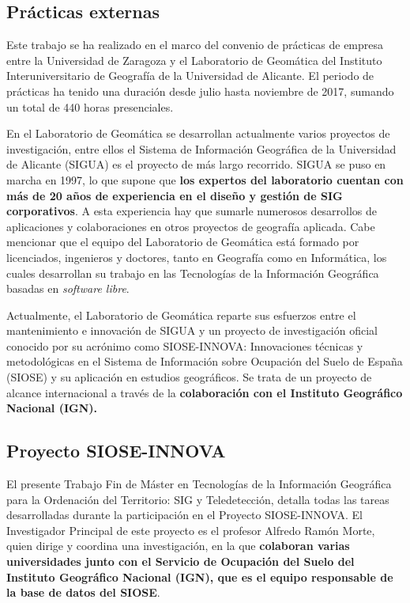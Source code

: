 
\begin{prologo}\label{chap:prol}

\subsection*{Prácticas externas}
Este trabajo se ha realizado en el marco del convenio de prácticas de empresa entre la Universidad de Zaragoza y el Laboratorio de Geomática del Instituto Interuniversitario de Geografía de la Universidad de Alicante. El periodo de prácticas ha tenido una duración desde julio hasta noviembre de 2017, sumando un total de 440 horas presenciales.

En el Laboratorio de Geomática se desarrollan actualmente varios proyectos de investigación, entre ellos el Sistema de Información Geográfica de la Universidad de Alicante (SIGUA) es el proyecto de más largo recorrido. SIGUA se puso en marcha en 1997, lo que supone que \textbf{los expertos del laboratorio cuentan con más de 20 años de experiencia en el diseño y gestión de SIG corporativos}. A esta experiencia hay que sumarle numerosos desarrollos de aplicaciones y colaboraciones en otros proyectos de geografía aplicada. Cabe mencionar que el equipo del Laboratorio de Geomática está formado por licenciados, ingenieros y doctores, tanto en Geografía como en Informática, los cuales desarrollan su trabajo en las Tecnologías de la Información Geográfica basadas en \textit{software libre}.

Actualmente, el Laboratorio de Geomática reparte sus esfuerzos entre el mantenimiento e innovación de SIGUA y un proyecto de investigación oficial conocido por su acrónimo como SIOSE-INNOVA: Innovaciones técnicas y metodológicas en el Sistema de Información sobre Ocupación del Suelo de España (SIOSE) y su aplicación en estudios geográficos. Se trata de un proyecto de alcance internacional a través de la \textbf{colaboración con el Instituto Geográfico Nacional (IGN).}

\subsection*{Proyecto SIOSE-INNOVA}
El presente Trabajo Fin de Máster en Tecnologías de la Información Geográfica para la Ordenación del Territorio: SIG y Teledetección, detalla todas las tareas desarrolladas durante la participación en el Proyecto SIOSE-INNOVA. El Investigador Principal de este proyecto es el profesor Alfredo Ramón Morte, quien dirige y coordina una investigación, en la que \textbf{colaboran varias universidades junto con el  Servicio de Ocupación del Suelo del Instituto Geográfico Nacional (IGN), que es el equipo responsable de la base de datos del SIOSE}.


\end{prologo}
